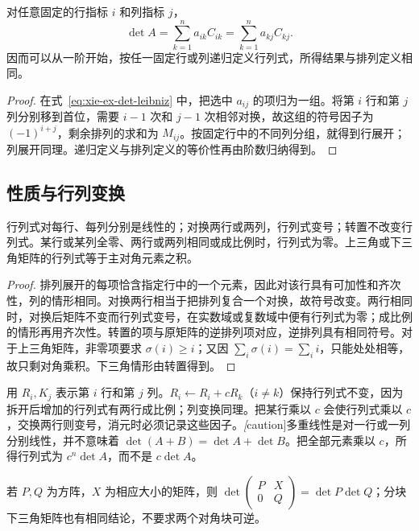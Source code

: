 \begin{theorem}[按一行或一列展开]
\label{thm:xie-ex-det-expansion}
对任意固定的行指标 $i$ 和列指标 $j$，
\begin{equation}
\label{eq:xie-ex-det-expansion}
\det A=\sum_{k=1}^{n}a_{ik}C_{ik}
=\sum_{k=1}^{n}a_{kj}C_{kj}.
\end{equation}
因而可以从一阶开始，按任一固定行或列递归定义行列式，所得结果与排列定义相同。
\end{theorem}

\begin{proof}
在式~\eqref{eq:xie-ex-det-leibniz} 中，把选中 $a_{ij}$ 的项归为一组。将第 $i$ 行和第 $j$ 列分别移到首位，需要 $i-1$ 次和 $j-1$ 次相邻对换，故这组的符号因子为 $(-1)^{i+j}$，剩余排列的求和为 $M_{ij}$。按固定行中的不同列分组，就得到行展开；列展开同理。递归定义与排列定义的等价性再由阶数归纳得到。
\end{proof}

\subsection{性质与行列变换}

\begin{proposition}
\label{prop:xie-ex-det-properties}
行列式对每行、每列分别是线性的；对换两行或两列，行列式变号；转置不改变行列式。某行或某列全零、两行或两列相同或成比例时，行列式为零。上三角或下三角矩阵的行列式等于主对角元素之积。
\end{proposition}

\begin{proof}
排列展开的每项恰含指定行中的一个元素，因此对该行具有可加性和齐次性，列的情形相同。对换两行相当于把排列复合一个对换，故符号改变。两行相同时，对换后矩阵不变而行列式变号，在实数域或复数域中便有行列式为零；成比例的情形再用齐次性。转置的项与原矩阵的逆排列项对应，逆排列具有相同符号。对于上三角矩阵，非零项要求 $\sigma(i)\geq i$；又因 $\sum_i\sigma(i)=\sum_i i$，只能处处相等，故只剩对角乘积。下三角情形由转置得到。
\end{proof}

用 $R_i,K_j$ 表示第 $i$ 行和第 $j$ 列。$R_i\leftarrow R_i+cR_k$（$i\ne k$）保持行列式不变，因为拆开后增加的行列式有两行成比例；列变换同理。把某行乘以 $c$ 会使行列式乘以 $c$，交换两行则变号，消元时必须记录这些因子。\emph[caution]{多重线性是对一行或一列分别线性，并不意味着 $\det(A+B)=\det A+\det B$。}把全部元素乘以 $c$，所得行列式为 $c^n\det A$，而不是 $c\det A$。

\begin{proposition}[分块三角性质]
\label{prop:xie-ex-det-basic-blocks}
若 $P,Q$ 为方阵，$X$ 为相应大小的矩阵，则 $\det\begin{pmatrix}P&X\\0&Q\end{pmatrix}=\det P\det Q$；分块下三角矩阵也有相同结论，不要求两个对角块可逆。
\end{proposition}

